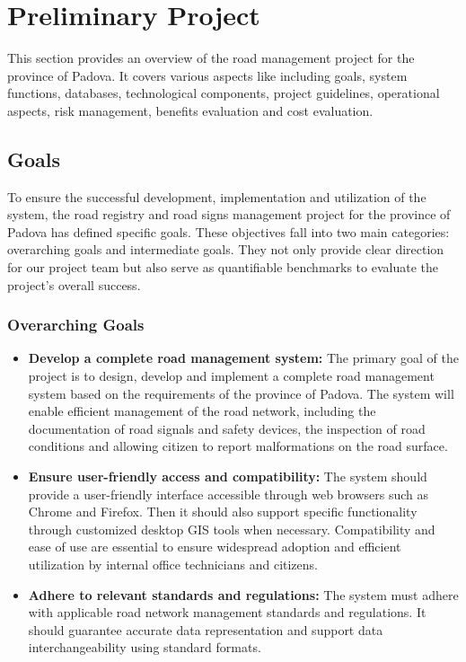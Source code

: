 \section{Preliminary Project}
This section provides an overview of the road management project for the province of Padova. It covers various aspects like including goals, system functions, databases, technological components, project guidelines, operational aspects, risk management, benefits evaluation and cost evaluation. 

\subsection{Goals}
To ensure the successful development, implementation and utilization of the system, the road registry and road signs management project for the province of Padova has defined specific goals. These objectives fall into two main categories: overarching goals and intermediate goals. They not only provide clear direction for our project team but also serve as quantifiable benchmarks to evaluate the project's overall success.

\subsubsection{Overarching Goals}
\begin{itemize}
    \item\textbf {Develop a complete road management system:}
    The primary goal of the project is to design, develop and implement a complete road management system based on the requirements of the province of Padova. The system will enable efficient management of the road network, including the documentation of road signals and safety devices, the inspection of road conditions and allowing citizen to report malformations on the road surface.
    \item\textbf {Ensure user-friendly access and compatibility:}
    The system should provide a user-friendly interface accessible through web browsers such as Chrome and Firefox. Then it should also support specific functionality through customized desktop GIS tools when necessary. Compatibility and ease of use are essential to ensure widespread adoption and efficient utilization by  internal office technicians and citizens.
    \item\textbf {Adhere to relevant standards and regulations:}
    The system must adhere with applicable road network management standards and regulations. It should guarantee accurate data representation and support data interchangeability using standard formats.
\end{itemize}


